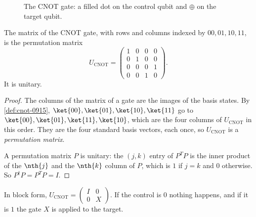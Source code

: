 \begin{figure}[ht]
    \centering
    \caption{The CNOT gate: a filled dot on the control qubit and $\oplus$ on the target qubit.}
    \label{fig:cnot-0915}
\end{figure}

\begin{lemma}\label{lem:cnot-0915}
    The matrix of the CNOT gate, with rows and columns indexed by $00, 01, 10, 11$, is the
    permutation matrix
    \[U_{\mathrm{CNOT}} = \begin{pmatrix}
            1 & 0 & 0 & 0 \\
            0 & 1 & 0 & 0 \\
            0 & 0 & 0 & 1 \\
            0 & 0 & 1 & 0
        \end{pmatrix}.\]
    It is unitary.
\end{lemma}

\begin{proof}
    The columns of the matrix of a gate are the images of the basis states. By \cref{def:cnot-0915},
    $\ket{00}, \ket{01}, \ket{10}, \ket{11}$ go to $\ket{00}, \ket{01}, \ket{11}, \ket{10}$, which
    are the four columns of $U_{\mathrm{CNOT}}$ in this order. They are the four standard basis
    vectors, each once, so $U_{\mathrm{CNOT}}$ is a \emph{permutation matrix}.

    A permutation matrix $P$ is unitary: the $(j, k)$ entry of $P^T P$ is the inner product of the
    $\nth{j}$ and the $\nth{k}$ column of $P$, which is $1$ if $j = k$ and $0$ otherwise. So
    $P^\dagger P = P^T P = I$.
\end{proof}

In block form, $U_{\mathrm{CNOT}} = \begin{pmatrix} I & 0 \\ 0 & X \end{pmatrix}$. If the control is
$0$ nothing happens, and if it is $1$ the gate $X$ is applied to the target.

